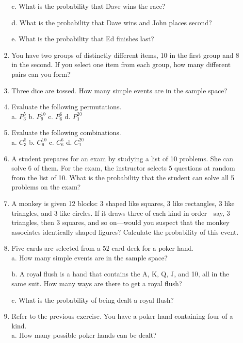 \documentclass{article}
\begin{document}
\begin{enumerate}
c. What is the probability that Dave wins the race?

d. What is the probability that Dave wins and John places second?

e. What is the probability that Ed finishes last?

\item You have two groups of distinctly different items, 10 in the first group and 8 in the second. If you select one item from each group, how many different pairs can you form?
\item Three dice are tossed. How many simple events are in the sample space?


\item Evaluate the following permutations. \\

 a. $P_3^5$    b. $P_9^{10}$    c. $P_6^6$    d. $P_1^{20}$ \\

\item Evaluate the following combinations. \\

 a. $C_3^5$    b. $C_9^{10}$    c. $C_6^6$    d. $C_1^{20}$ \\

\item A student prepares for an exam by studying a list of 10 problems. She can solve 6 of them. For the exam, the instructor selects 5 questions at random from the list of 10. What is the probability that the student can solve all 5 problems on the exam?

\item A monkey is given 12 blocks: 3 shaped like squares, 3 like rectangles, 3 like triangles, and 3 like circles. If it draws three of each kind in order—say, 3 triangles, then 3 squares, and so on—would you suspect that the monkey associates identically shaped figures? Calculate the probability of this event.

\item Five cards are selected from a 52-card deck for a poker hand. \\ 
a. How many simple events are in the sample space?

b. A royal flush is a hand that contains the A, K, Q, J, and 10, all in the same suit. How many ways are there to get a royal flush?

c. What is the probability of being dealt a royal flush?

\item Refer to the previous exercise. You have a poker hand containing four of a kind. \\ 
a. How many possible poker hands can be dealt?


\end{enumerate}
\end{document}
